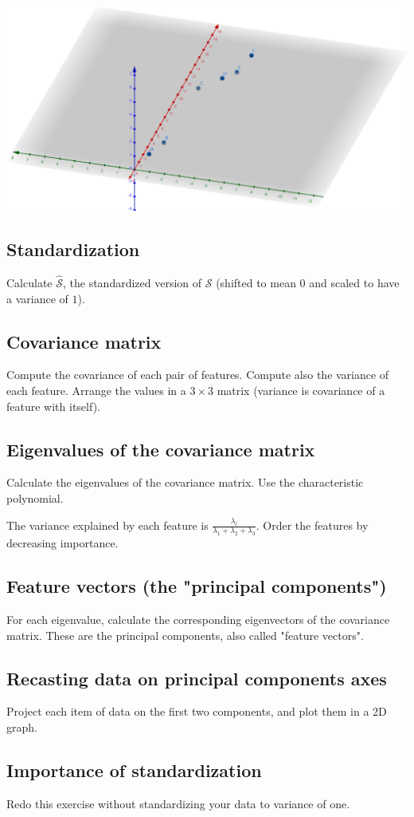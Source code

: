 \documentclass[]{article}
\begin{document}
	\begin{center}
		\vspace{0.2cm}
		\includegraphics[width=0.95\linewidth]{points}
		\vspace{0.2cm}
	\end{center}
	
	\subsection{Standardization}
	Calculate $\hat{\mathcal{S}}$, the standardized version of $\mathcal{S}$ (shifted to mean $0$ and scaled to have a variance of $1$).
	
	\subsection{Covariance matrix}
	Compute the covariance of each pair of features.
	Compute also the variance of each feature.
	Arrange the values in a $3 \times 3$ matrix (variance is covariance of a feature with itself).
	
	\subsection{Eigenvalues of the covariance matrix}
	Calculate the eigenvalues of the covariance matrix.
	Use the characteristic polynomial.
	
	The variance explained by each feature is $\frac{\lambda_i}{\lambda_1+\lambda_2+\lambda_3}$.
	Order the features by decreasing importance.
	
	\subsection{Feature vectors (the "principal components")}
	For each eigenvalue, calculate the corresponding eigenvectors of the covariance matrix.
	These are the principal components, also called "feature vectors".
	
	\subsection{Recasting data on principal components axes}
	Project each item of data on the first two components, and plot them in a 2D graph.
	
	\subsection{Importance of standardization}
	Redo this exercise without standardizing your data to variance of one.
\end{document}
